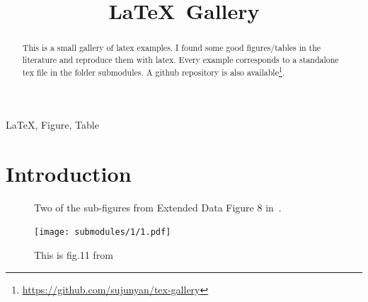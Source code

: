\documentclass[conference]{IEEEtran}
\title{\LaTeX\, Gallery}
\author{
    \IEEEauthorblockN{Junyan Su}
    \IEEEauthorblockA{junyan.su@my.cityu.edu.hk}
}
\begin{document}
\maketitle

\begin{abstract}
    This is a small gallery of latex examples. I found some good figures/tables in the literature and reproduce them with latex. Every example corresponds to a standalone tex file in the folder submodules. A github repository is also available\footnote{\url{https://github.com/sujunyan/tex-gallery}}.
\end{abstract}


\begin{IEEEkeywords}
    \LaTeX , Figure, Table
\end{IEEEkeywords}

\section{Introduction}
\lipsum[1]
\begin{figure}[tb]
      \centering
        \subfigure[A subcaption]{
            
        }
        \centering
    \caption{Two of the sub-figures from Extended Data Figure 8 in~\cite{2}.}
\end{figure}

\lipsum[1]
\begin{figure}[htb]
    \begin{center}
        \texttt{[image: submodules/1/1.pdf]}
    \end{center} 
    \caption{This is fig.11 from~\cite{1}}
\end{figure}
\end{document}
